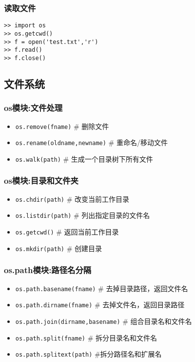 \documentclass[13pt]{beamer}
\begin{document}
\begin{frame}[containsverbatim]
\frametitle{读取文件}
\begin{lstlisting}
>> import os
>> os.getcwd()
>> f = open('test.txt','r')
>> f.read()
>> f.close()
\end{lstlisting} 
\end{frame}

\subsection{文件系统}
\begin{frame}
\frametitle{os模块:文件处理}
\begin{itemize}
  \item \lstinline{os.remove(fname)}  \# 删除文件
  \item \lstinline{os.rename(oldname,newname)}  \# 重命名/移动文件
  \item \lstinline{os.walk(path)} \# 生成一个目录树下所有文件
\end{itemize}
\end{frame}

\begin{frame}
\frametitle{os模块:目录和文件夹}
\begin{itemize}
  \item \lstinline{os.chdir(path)}  \# 改变当前工作目录
  \item \lstinline{os.listdir(path)}  \# 列出指定目录的文件名
  \item \lstinline{os.getcwd()} \# 返回当前工作目录
  \item \lstinline{os.mkdir(path)} \# 创建目录
\end{itemize}
\end{frame}

\begin{frame}
\frametitle{os.path模块:路径名分隔}
\begin{itemize}
  \item \lstinline{os.path.basename(fname)} \# 去掉目录路径，返回文件名
  \item \lstinline{os.path.dirname(fname)}  \# 去掉文件名，返回目录路径
  \item \lstinline{os.path.join(dirname,basename)} \# 组合目录名和文件名
  \item \lstinline{os.path.split(fname)} \# 拆分目录名和文件名
  \item \lstinline{os.path.splitext(path)} \#拆分路径名和扩展名
\end{itemize}
\end{frame}
\end{document}
